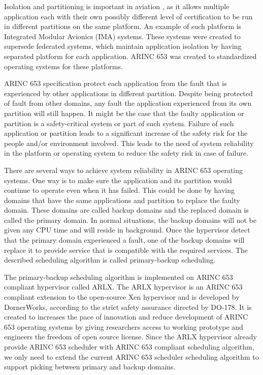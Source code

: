 \documentclass[conference]{IEEEtran}
\begin{document}
Isolation and partitioning is important in aviation \cite{Rushby2000}, as it allows multiple
application each with their own possibly different level of certification to be run in different
partitions on the same platform. An example of such platform is Integrated Modular Avionics
(IMA) systems. These systems were created to supersede federated systems, which maintain
application isolation by having separated platform for each application. ARINC 653 was created
to standardized operating systems for these platforms.

ARINC 653 specification protect each application from the fault that is experienced by other
applications in different partition. Despite being protected of fault from other domains, any
fault the application experienced from its own partition will still happen. It might be the case
that the faulty application or partition is a safety-critical system or part of such system.
Failure of such application or partition leads to a significant increase of the safety risk for
the people and/or environment involved. This leads to the need of system reliability in the
platform or operating system to reduce the safety risk in case of failure.

There are several ways to achieve system reliability in ARINC 653 operating systems. One way is
to make sure the application and its partition would continue to operate even when it has
failed. This could be done by having domains that have the same applications and partition to
replace the faulty domain. These domains are called backup domains and the replaced domain is
called the primary domain. In normal situations, the backup domains will not be given any CPU
time and will reside in background. Once the hypervisor detect that the primary domain
experienced a fault, one of the backup domains will replace it to provide service that is
compatible with the required services. The described scheduling algorithm is called
primary-backup scheduling.

The primary-backup scheduling algorithm is implemented on ARINC 653 compliant hypervisor called
ARLX. The ARLX hypervisor is an ARINC 653 compliant extension to the open-source Xen hypervisor
and is developed by DornerWorks, according to the strict safety assurance directed by DO-178.
It is created to increases the pace of innovation and reduce development of ARINC 653 operating
systems by giving researchers access to working prototype and engineers the freedom of open
source license. Since the ARLX hypervisor already provide ARINC 653 scheduler with ARINC 653
compliant scheduling algorithm, we only need to extend the current ARINC 653 scheduler
scheduling algorithm to support picking between primary and backup domains.
\end{document}
